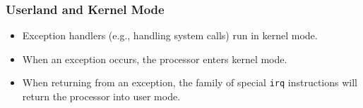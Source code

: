 \begin{frame}

\frametitle{Userland and Kernel Mode}

\begin{itemize}

\item Exception handlers (e.g., handling system calls) run in kernel mode.

\item When an exception occurs, the processor enters kernel mode.

\item When returning from an exception, the family of special \texttt{irq}
instructions will return the processor into user mode.

\end{itemize}

\end{frame}
